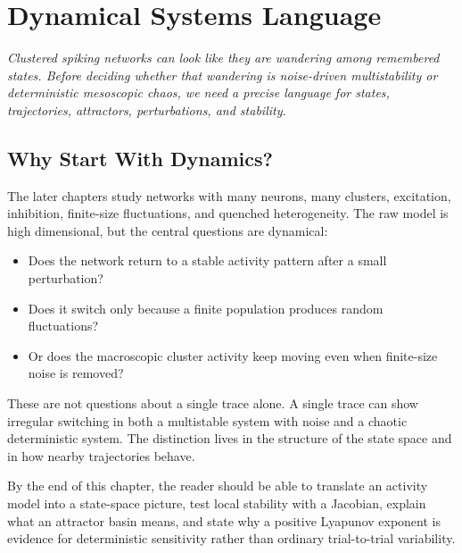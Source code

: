 \chapter{Dynamical Systems Language}
\label{ch:dynamical-systems-language}

\textit{Clustered spiking networks can look like they are wandering among remembered states. Before deciding whether that wandering is noise-driven multistability or deterministic mesoscopic chaos, we need a precise language for states, trajectories, attractors, perturbations, and stability.}

\section{Why Start With Dynamics?}
\label{sec:why-start-with-dynamics}

The later chapters study networks with many neurons, many clusters, excitation, inhibition, finite-size fluctuations, and quenched heterogeneity. The raw model is high dimensional, but the central questions are dynamical:

\begin{itemize}
  \item Does the network return to a stable activity pattern after a small perturbation?
  \item Does it switch only because a finite population produces random fluctuations?
  \item Or does the macroscopic cluster activity keep moving even when finite-size noise is removed?
\end{itemize}

These are not questions about a single trace alone. A single trace can show irregular switching in both a multistable system with noise and a chaotic deterministic system. The distinction lives in the structure of the state space and in how nearby trajectories behave.

By the end of this chapter, the reader should be able to translate an activity model into a state-space picture, test local stability with a Jacobian, explain what an attractor basin means, and state why a positive Lyapunov exponent is evidence for deterministic sensitivity rather than ordinary trial-to-trial variability.

